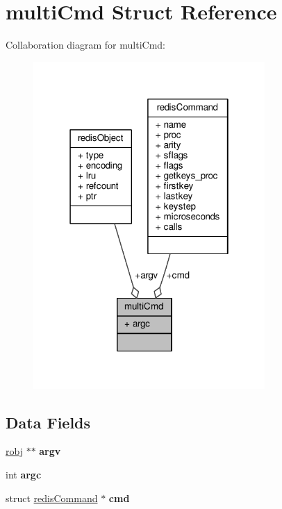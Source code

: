 \hypertarget{structmultiCmd}{}\section{multi\+Cmd Struct Reference}
\label{structmultiCmd}


Collaboration diagram for multi\+Cmd\+:\nopagebreak
\begin{figure}[H]
\begin{center}
\leavevmode
\includegraphics[width=250pt]{structmultiCmd__coll__graph}
\end{center}
\end{figure}
\subsection*{Data Fields}
\begin{DoxyCompactItemize}
\item 
\mbox{\label{structmultiCmd_a4504f1b95d493e4ea414629843281b9d}} 
\hyperlink{structredisObject}{robj} $\ast$$\ast$ {\bfseries argv}
\item 
\mbox{\label{structmultiCmd_af4ce1743e1f985dded2143cb89b9614d}} 
int {\bfseries argc}
\item 
\mbox{\label{structmultiCmd_a0f38052708e902f90c9ea505a02dd834}} 
struct \hyperlink{structredisCommand}{redis\+Command} $\ast$ {\bfseries cmd}
\end{DoxyCompactItemize}


